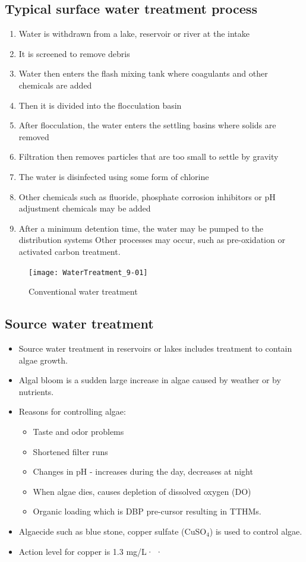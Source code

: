 \begin{itemize}
\subsection{Typical surface water treatment process} 
\begin{enumerate}
\item Water is withdrawn from a lake, reservoir or river at the intake
\item It is screened to remove debris
\item Water then enters the flash mixing tank where coagulants and other chemicals are added
\item Then it is divided into the flocculation basin
\item After flocculation, the water enters the settling basins where solids are removed
\item Filtration then removes particles that are too small to settle by gravity
\item The water is disinfected using some form of chlorine
\item Other chemicals such as fluoride, phosphate corrosion inhibitors or pH adjustment chemicals may be added
\item After a minimum detention time, the water may be pumped to the distribution systems Other processes may occur, such as pre-oxidation or activated carbon treatment.
\end{enumerate}

\begin{figure}[h]
\begin{center}
\texttt{[image: WaterTreatment\_9-01]}
\caption{Conventional water treatment} 
\end{center}
\end{figure}
\subsection{Source water treatment}
\begin{itemize}
\item Source water treatment in reservoirs or lakes includes treatment to contain algae growth.
\item Algal bloom is a sudden large increase in algae caused by weather or by nutrients. 
\item Reasons for controlling algae:
\begin{itemize}
\item Taste and odor problems
\item Shortened filter runs
\item Changes in pH - increases during the day, decreases at night
\item When algae dies, causes depletion of dissolved oxygen (DO)
\item Organic loading which is DBP pre-cursor resulting in TTHMs.
\end{itemize}
\item Algaecide such as blue stone, copper sulfate (CuSO$_4$) is used to control algae. 
\item Action level for copper is 1.3 mg/L·	·


\end{itemize}
\end{itemize}
